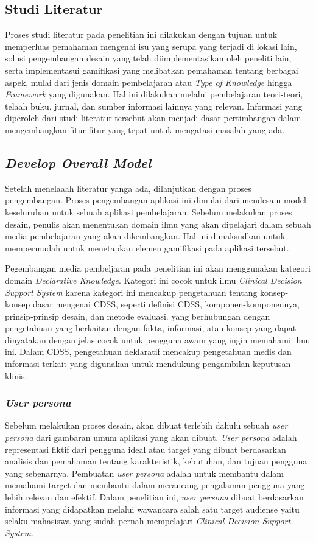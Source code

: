 \subsection{Studi Literatur}
Proses studi literatur pada penelitian ini dilakukan dengan tujuan untuk memperluas pemahaman mengenai isu yang serupa yang terjadi di lokasi lain, 
solusi pengembangan desain yang telah diimplementasikan oleh peneliti lain, serta implementasui gamifikasi yang melibatkan pemahaman tentang berbagai aspek, 
mulai dari jenis domain pembelajaran atau \textit{Type of Knowledge} hingga \textit{Framework} yang digunakan. 
Hal ini dilakukan melalui pembelajaran teori-teori, telaah buku, jurnal, dan sumber informasi lainnya yang relevan. 
Informasi yang diperoleh dari studi literatur tersebut akan menjadi dasar pertimbangan dalam mengembangkan fitur-fitur yang tepat untuk mengatasi masalah yang ada.
\subsection{\textit{Develop Overall Model}}
Setelah menelaaah literatur yanga ada, dilanjutkan dengan proses pengembangan. Proses pengembangan aplikasi ini dimulai dari mendesain model keseluruhan untuk sebuah aplikasi pembelajaran.
Sebelum melakukan proses desain, penulis akan menentukan domain ilmu yang akan dipelajari dalam sebuah media pembelajaran yang akan dikembangkan. Hal ini dimaksudkan untuk mempermudah untuk menetapkan elemen gamifikasi pada aplikasi tersebut.

Pegembangan media pembeljaran pada penelitian ini akan menggunakan kategori domain \textit{Declarative Knowledge}. Kategori ini cocok untuk ilmu \textit{Clinical Decision Support System} karena kategori ini mencakup pengetahuan tentang konsep-konsep dasar mengenai CDSS, seperti definisi CDSS, komponen-komponennya, prinsip-prinsip desain, dan metode evaluasi.
yang berhubungan dengan pengetahuan yang berkaitan dengan fakta, informasi, atau konsep yang dapat dinyatakan dengan jelas cocok untuk pengguna awam yang ingin memahami ilmu ini. Dalam CDSS, pengetahuan deklaratif mencakup pengetahuan medis dan informasi terkait yang digunakan untuk mendukung pengambilan keputusan klinis.

\subsubsection{\textit{User persona}}
Sebelum melakukan proses desain, akan dibuat terlebih dahulu sebuah \textit{user persona} dari gambaran umum aplikasi yang akan dibuat.
\textit{User persona} adalah representasi fiktif dari pengguna ideal atau target yang dibuat berdasarkan analisis dan pemahaman tentang karakteristik, kebutuhan, dan tujuan pengguna yang sebenarnya. 
Pembuatan \textit{user persona} adalah untuk membantu dalam memahami target dan membantu dalam merancang pengalaman pengguna yang lebih relevan dan efektif.
Dalam penelitian ini, \textit{user persona} dibuat berdasarkan informasi yang didapatkan melalui wawancara salah satu target audiense yaitu selaku mahasiswa yang sudah pernah mempelajari \textit{Clinical Decision Support System}.


